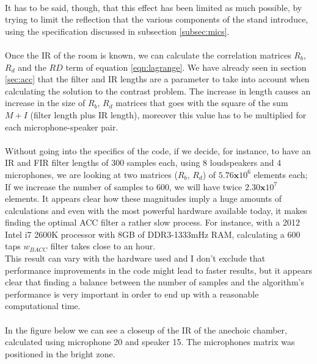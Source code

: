 \\
It has to be said, though, that this effect has been limited as much possible, by trying to limit the reflection that the various components of the stand introduce, using the specification discussed in subsection \ref{subsec:mics}.
\\
\\
Once the IR of the room is known, we can calculate the correlation matrices $R_b$, $R_d$ and the $RD$ term of equation \ref{eqn:lagrange}.
We have already seen in section \ref{sec:acc} that the filter and IR lengths are a parameter to take into account when calculating the solution to the contrast problem. The increase in length causes an increase in the size of $R_b$, $R_d$ matrices that goes with the square of the sum $M + I$ (filter length plus IR length), moreover this value has to be multiplied for each microphone-speaker pair.
\\
\\
Without going into the specifics of the code, if we decide, for instance, to have an IR and FIR filter lengths of $300$ samples each, using 8 loudspeakers and 4 microphones, we are looking at two matrices ($R_b$, $R_d$) of $5.76 \textbf{x} 10^6$ elements each; If we increase the number of samples to $600$, we will have twice $2.30 \textbf{x} 10^7$ elements. It appears clear how these magnitudes imply a huge amounts of calculations and even with the most powerful hardware available today, it makes finding the optimal ACC filter a rather slow process. For instance, with a 2012 Intel i7 2600K processor with 8GB of DDR3-1333mHz RAM, calculating a $600$ taps $w_{BACC}$ filter takes close to an hour.
\\
This result can vary with the hardware used and I don't exclude that performance improvements in the code might lead to faster results, but it appears clear that finding a balance between the number of samples and the algorithm's performance is very important in order to end up with a reasonable computational time.
\\
\\
In the figure below we can see a closeup of the IR of the anechoic chamber, calculated using microphone 20 and speaker 15. The microphones matrix was positioned in the bright zone.

